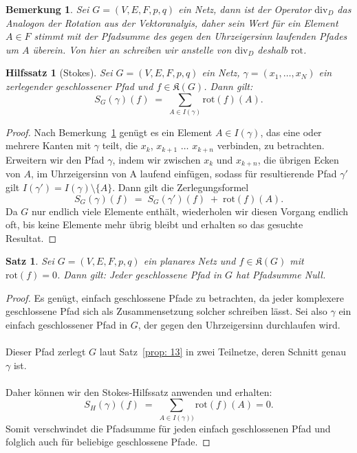 \documentclass[11pt,a4paper,leqno]{report}
\newtheorem{proposition}{Satz}[chapter]
\newtheorem{lemma}[theorem]{Hilfssatz}
\newtheorem{remark}[theorem]{Bemerkung}
\numberwithin{equation}{chapter}
\begin{document}
\begin{remark}\label{bem: 1}
	Sei $G=(V,E, F, p, q)$ ein Netz, dann ist der Operator $\mathrm{div}_D$ das Analogon der Rotation aus der Vektoranalyis, daher sein Wert für ein Element $A\in F$ stimmt mit der Pfadsumme des gegen den Uhrzeigersinn laufenden Pfades um $A$ überein. Von hier an schreiben wir anstelle von $\mathrm{div}_D$ deshalb $\mathrm{rot}$.
\end{remark}
\begin{lemma}[Stokes]
	Sei $G = (V, E, F, p, q)$ ein Netz, \(\gamma=(x_1,\dots,x_N)\) ein zerlegender geschlossener Pfad und $f \in \mathfrak{K}(G)$. 
	Dann gilt:
	\begin{equation}
		S_G(\gamma)(f) \;=\; \sum_{A \in I(\gamma)} \mathrm{rot}(f)(A).
	\end{equation}
\end{lemma}
\begin{proof}
	Nach Bemerkung~\ref{bem: 1} genügt es ein Element $A \in I(\gamma)$, das eine oder mehrere Kanten mit $\gamma$ teilt, die $x_k$, $x_{k+1}$ $\dots$ $x_{k+n}$ verbinden, zu betrachten.
	Erweitern wir den Pfad $\gamma$, indem wir zwischen $x_k$ und $x_{k+n}$,  die übrigen Ecken von $A$, im Uhrzeigersinn von A laufend einfügen, sodass für resultierende Pfad $\gamma'$ gilt $I(\gamma')=I(\gamma)\setminus\{A\}$.
	Dann gilt die Zerlegungsformel
	\[
	S_G(\gamma)(f) \;=\; S_G(\gamma')(f) \;+\; \mathrm{rot}(f)(A).
	\]
	Da $G$ nur endlich viele Elemente enthält, wiederholen wir diesen Vorgang endlich oft, bis keine Elemente mehr übrig bleibt und erhalten so das gesuchte Resultat.
\end{proof}
\begin{proposition}\label{pfadunab}
	Sei $G=(V,E,F,p,q)$ ein planares Netz und $f \in \mathfrak{K}(G)$ mit $\mathrm{rot}(f)=0$. 
	Dann gilt: Jeder geschlossene Pfad in $G$ hat Pfadsumme Null.
\end{proposition}
\begin{proof}
	Es genügt, einfach geschlossene Pfade zu betrachten, da jeder komplexere geschlossene Pfad sich als Zusammensetzung solcher schreiben lässt.
	Sei also $\gamma$ ein einfach geschlossener Pfad in $G$, der gegen den Uhrzeigersinn durchlaufen wird.\\
	\\
	Dieser Pfad zerlegt $G$ laut Satz~\ref{prop: 13} in zwei Teilnetze, deren Schnitt genau $\gamma$ ist.
	\\
	\\
	Daher können wir den Stokes-Hilfssatz anwenden und erhalten:
	\begin{equation}
		S_H(\gamma)(f) \;=\; \sum_{A \in I(\gamma))} \mathrm{rot}(f)(A) = 0.
	\end{equation}
	Somit verschwindet die Pfadsumme für jeden einfach geschlossenen Pfad und folglich auch für beliebige geschlossene Pfade.
\end{proof}
\end{document}
